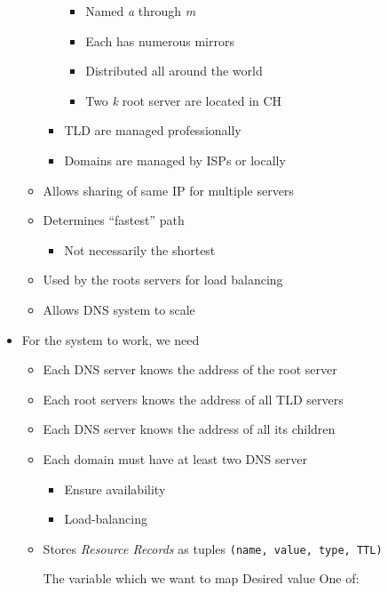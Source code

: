 \begin{itemize}
\begin{itemize}
\begin{itemize}
                        \begin{itemize}
                            \item Named \textit{a} through \textit{m}
                            \item Each has numerous mirrors
                            \item Distributed all around the world
                            \item Two \textit{k} root server are located in CH
                        \end{itemize}
                    \item TLD are managed professionally
                    \item Domains are managed by ISPs or locally
                \end{itemize}
        \end{itemize}
        \begin{itemize}
            \item Allows sharing of same IP for multiple servers
            \item Determines ``fastest'' path
                \begin{itemize}
                    \item Not necessarily the shortest
                \end{itemize}
            \item Used by the roots servers for load balancing
            \item Allows DNS system to scale
        \end{itemize}
    \item For the system to work, we need
        \begin{itemize}
            \item Each DNS server knows the address of the root server
            \item Each root servers knows the address of all TLD servers
            \item Each DNS server knows the address of all its children
        \end{itemize}
        \begin{itemize}
            \item Each domain must have at least two DNS server
                \begin{itemize}
                    \item Ensure availability
                    \item Load-balancing
                \end{itemize}
            \item Stores \textit{Resource Records} as tuples \verb+(name, value, type, TTL)+
                \begin{itemize}
                     The variable which we want to map
                     Desired value
                     One of:


\end{itemize}
\end{itemize}
\end{itemize}
